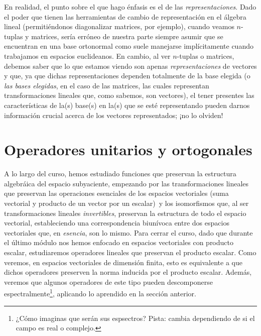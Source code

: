 \documentclass[12pt,dvipsnames]{article}
\begin{document}
\begin{tcolorbox}
\vspace{3mm}
\hspace{2.5mm} En realidad, el punto sobre el que hago énfasis es el de las \emph{representaciones}. Dado el poder que tienen las herramientas de cambio de representación en el álgebra lineal (permitiéndonos diagonalizar matrices, por ejemplo), cuando veamos $n$-tuplas y matrices, sería erróneo de nuestra parte siempre asumir que se encuentran en una base ortonormal \textemdash como suele manejarse implícitamente cuando trabajamos en espacios euclideanos. En cambio, al ver $n$-tuplas o matrices, debemos saber que lo que estamos viendo son apenas \emph{representaciones} de vectores y que, ya que dichas representaciones dependen totalmente de la base elegida (o \emph{las bases elegidas}, en el caso de las matrices, las cuales representan transformaciones lineales que, como sabemos, son vectores), el tener presentes las características de la(s) base(s) en la(s) que se esté representando pueden darnos información crucial acerca de los vectores representados; ¡no lo olviden!
\end{tcolorbox}

\newpage
\section{Operadores unitarios y ortogonales} \label{Sec:16} 

A lo largo del curso, hemos estudiado funciones que preservan la estructura algebráica del espacio subyaciente, empezando por las transformaciones lineales \textemdash que preservan las operaciones esenciales de los espacios vectoriales (suma vectorial y producto de un vector por un escalar)\textemdash \ y los isomorfismos \textemdash que, al ser transformaciones lineales \emph{invertibles}, preservan la estructura de todo el espacio vectorial, estableciendo una correspondencia biunívoca entre dos espacios vectoriales que, en \emph{esencia}, son lo mismo. Para cerrar el curso, dado que durante el último módulo nos hemos enfocado en espacios vectoriales con producto escalar, estudiaremos operadores lineales que preservan el producto escalar. Como veremos, en espacios vectoriales de dimensión finita, esto es equivalente a que dichos operadores preserven la norma inducida por el producto escalar. Además, veremos que algunos operadores de este tipo pueden descomponerse espectralmente\footnote{¿Cómo imaginas que serán sus espsectros? Pista: cambia dependiendo de si el campo es real o complejo.}, aplicando lo aprendido en la sección anterior.
\end{document}
